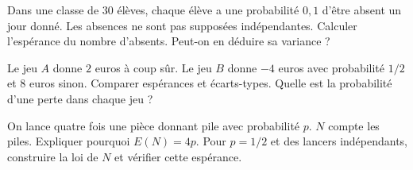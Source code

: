 \documentclass[11pt,a4paper]{article}
\begin{document}
\par\noindent\begin{minipage}{\linewidth}
Dans une classe de $30$ élèves, chaque élève a une probabilité $0,1$ d’être absent un jour donné. Les absences ne sont pas supposées indépendantes. Calculer l’espérance du nombre d’absents. Peut-on en déduire sa variance ?
\end{minipage}\par
\par\noindent\begin{minipage}{\linewidth}
Le jeu $A$ donne $2$ euros à coup sûr. Le jeu $B$ donne $-4$ euros avec probabilité $1/2$ et $8$ euros sinon. Comparer espérances et écarts-types. Quelle est la probabilité d’une perte dans chaque jeu ?
\end{minipage}\par
\par\noindent\begin{minipage}{\linewidth}
On lance quatre fois une pièce donnant pile avec probabilité $p$. $N$ compte les piles. Expliquer pourquoi $E(N)=4p$. Pour $p=1/2$ et des lancers indépendants, construire la loi de $N$ et vérifier cette espérance.
\end{minipage}\par
\end{document}
